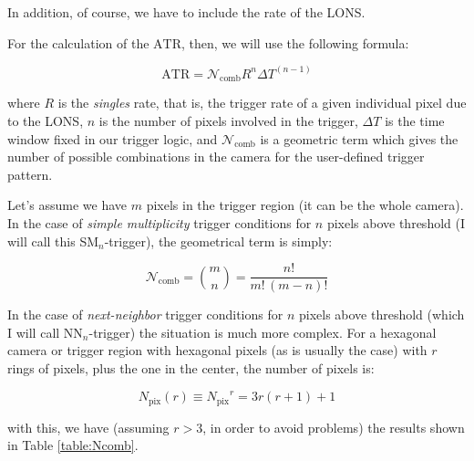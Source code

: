 \documentclass{article}
\def\ATR{\ensuremath{\mathrm{ATR}}\xspace}
\def\Ncomb{\ensuremath{\mathcal{N}_{\mathrm{comb}}}\xspace}
\def\Npix{\ensuremath{N_{\mathrm{pix}}}\xspace}
\def\Rate{\ensuremath{R}\xspace}
\def\Time{\ensuremath{\Delta T}\xspace}
\begin{document}
In addition, of course, we have to include the rate of the LONS.

For the calculation of the \ATR, then, we will use the following
formula:

\begin{equation*}
\ATR = \Ncomb \Rate^{n} \Time^{(n-1)}
\end{equation*}

where \Rate is the \emph{singles} rate, that is, the trigger rate of a
given individual pixel due to the LONS, $n$ is the number of pixels
involved in the trigger, \Time is the time window fixed in our trigger
logic, and \Ncomb is a geometric term which gives the number of
possible combinations in the camera for the user-defined trigger
pattern.

Let's assume we have $m$ pixels in the trigger region (it can be the
whole camera). In the case of \emph{simple multiplicity} trigger
conditions for $n$ pixels above threshold (I will call this
SM$_n$-trigger), the geometrical term is simply:

\begin{equation*}
\Ncomb = \binom{m}{n} = \frac{n!}{m!\,(m-n)!}
\end{equation*}

In the case of \emph{next-neighbor} trigger conditions for $n$ pixels
above threshold (which I will call NN$_n$-trigger) the situation is
much more complex. For a hexagonal camera or trigger region with
hexagonal pixels (as is usually the case) with $r$ rings of pixels,
plus the one in the center, the number of pixels is:

\begin{equation*}
\Npix(r) \equiv \Npix^r = 3 r (r+1) + 1
\end{equation*}

with this, we have (assuming $r>3$, in order to avoid problems) the
results shown in Table \ref{table:Ncomb}.
\end{document}
